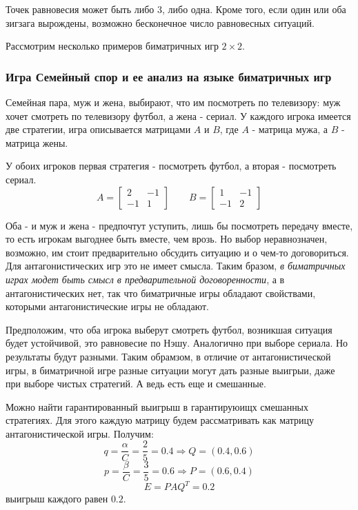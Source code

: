 \documentclass[aps,%
12pt,%
final,%
oneside,
onecolumn,%
musixtex, %
superscriptaddress,%
centertags]{article} %
\theoremstyle{plain}
\theoremstyle{definition}
\theoremstyle{remark}
\begin{document}
Точек равновесия может быть либо $3$, либо одна. Кроме того, если один или оба зигзага вырождены, возможно бесконечное число равновесных ситуаций.

Рассмотрим несколько примеров биматричных игр $2\times 2$.

\subsubsection{Игра Семейный спор и ее анализ на языке биматричных игр}

Семейная пара, муж и жена, выбирают, что им посмотреть по телевизору: муж хочет смотреть по телевизору футбол, а жена - сериал. У каждого игрока имеется две стратегии, игра описывается матрицами $A$ и $B$, где $A$ - матрица мужа, а $B$ - матрица жены.

У обоих игроков первая стратегия - посмотреть футбол, а вторая - посмотреть сериал.
$$A = \begin{bmatrix}
  2 & -1 \\
  -1 & 1 
\end{bmatrix} \qquad B = \begin{bmatrix}
  1 & -1 \\
  -1 & 2 
\end{bmatrix}$$

Оба -  и муж и жена - предпочтут уступить, лишь бы посмотреть передачу вместе, то есть игрокам выгоднее быть вместе, чем врозь. Но выбор неравнозначен, возможно, им стоит предварительно обсудить ситуацию и о чем-то договориться. Для антагонистических игр это не имеет смысла. Таким бразом, \textit{в биматричных играх модет быть смысл в предварительной договоренности}, а в антагонистических нет, так что биматричные игры обладают свойствами, которыми антагонистические игры не обладают.

Предположим, что оба игрока выберут смотреть футбол, возникшая ситуация будет устойчивой, это равновесие по Нэшу. Аналогично при выборе сериала. Но результаты будут разными. Таким обрамзом, в отличие от антагонистической игры, в биматричной игре разные ситуации могут дать разные выигрыи, даже при выборе чистых стратегий. А ведь есть еще и смешанные.

Можно найти гарантированный выигрыш в гарантируюищх смешанных стратегиях. Для этого каждую матрицу будем рассматривать как матрицу антагонистической игры. Получим:
$$q = \frac{\alpha}{C} = \frac{2}{5} = 0.4 \Rightarrow Q = (0.4,0.6)$$
$$p = \frac{\beta}{C} = \frac{3}{5} = 0.6 \Rightarrow P = (0.6,0.4)$$
$$E = PAQ^T = 0.2$$
выигрыш каждого равен $0.2$. 
\end{document}
